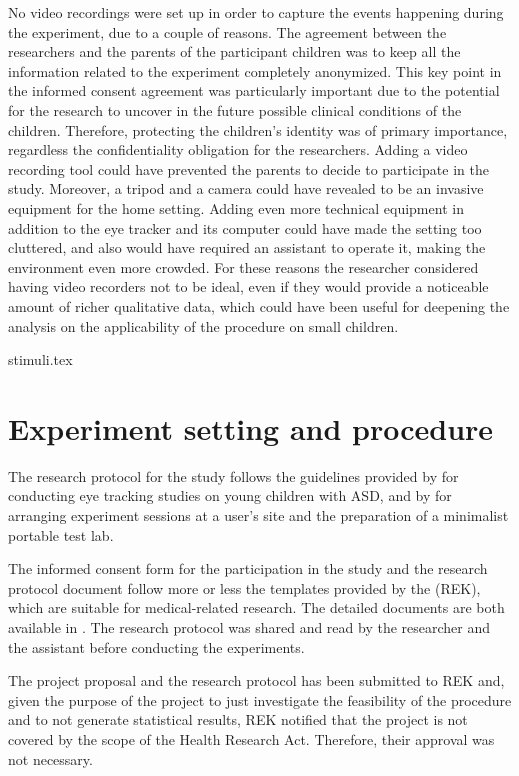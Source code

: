 No video recordings were set up in order to capture the events happening during the experiment, due to a couple of reasons. The agreement between the researchers and the parents of the participant children was to keep all the information related to the experiment completely anonymized. This key point in the informed consent agreement was particularly important due to the potential for the research to uncover in the future possible clinical conditions of the children. Therefore, protecting the children’s identity was of primary importance, regardless the confidentiality obligation for the researchers. Adding a video recording tool could have prevented the parents to decide to participate in the study. Moreover, a tripod and a camera could have revealed to be an invasive equipment for the home setting. Adding even more technical equipment in addition to the eye tracker and its computer could have made the setting too cluttered, and also would have required an assistant to operate it, making the environment even more crowded. For these reasons the researcher considered having video recorders not to be ideal, even if they would provide a noticeable amount of richer qualitative data, which could have been useful for deepening the analysis on the applicability of the procedure on small children.




{stimuli.tex}




\section{Experiment setting and procedure}
\label{sec:expsetting}

The research protocol for the study follows the guidelines provided by \cite{sasson2012children} for conducting eye tracking studies on young children with ASD, and by \cite[pp. 98-101]{rubinchisnell2008hout} for arranging experiment sessions at a user’s site and the preparation of a minimalist portable test lab.

The informed consent form for the participation in the study and the research protocol document follow more or less the templates provided by the \cite{rek2017templates}(REK), which are suitable for medical-related research. The detailed documents are both available in . The research protocol was shared and read by the researcher and the assistant before conducting the experiments.

The project proposal and the research protocol has been submitted to REK and, given the purpose of the project to just investigate the feasibility of the procedure and to not generate statistical results, REK notified that the project is not covered by the scope of the Health Research Act. Therefore, their approval was not necessary.

